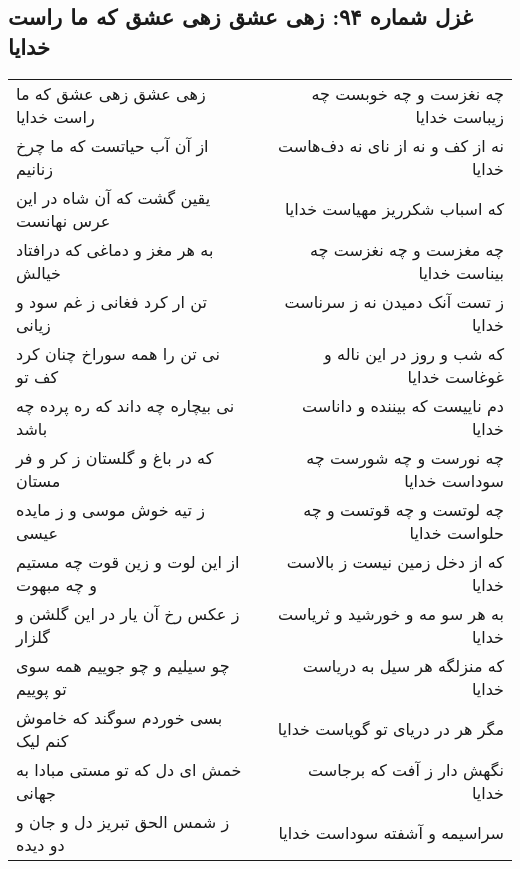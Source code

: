 \begin{center}
\section*{غزل شماره ۹۴: زهی عشق زهی عشق که ما راست خدایا}
\label{sec:0094}
\begin{longtable}{l p{0.5cm} r}
زهی عشق زهی عشق که ما راست خدایا
&&
چه نغزست و چه خوبست چه زیباست خدایا
\\
از آن آب حیاتست که ما چرخ زنانیم
&&
نه از کف و نه از نای نه دف‌هاست خدایا
\\
یقین گشت که آن شاه در این عرس نهانست
&&
که اسباب شکرریز مهیاست خدایا
\\
به هر مغز و دماغی که درافتاد خیالش
&&
چه مغزست و چه نغزست چه بیناست خدایا
\\
تن ار کرد فغانی ز غم سود و زیانی
&&
ز تست آنک دمیدن نه ز سرناست خدایا
\\
نی تن را همه سوراخ چنان کرد کف تو
&&
که شب و روز در این ناله و غوغاست خدایا
\\
نی بیچاره چه داند که ره پرده چه باشد
&&
دم ناییست که بیننده و داناست خدایا
\\
که در باغ و گلستان ز کر و فر مستان
&&
چه نورست و چه شورست چه سوداست خدایا
\\
ز تیه خوش موسی و ز مایده عیسی
&&
چه لوتست و چه قوتست و چه حلواست خدایا
\\
از این لوت و زین قوت چه مستیم و چه مبهوت
&&
که از دخل زمین نیست ز بالاست خدایا
\\
ز عکس رخ آن یار در این گلشن و گلزار
&&
به هر سو مه و خورشید و ثریاست خدایا
\\
چو سیلیم و چو جوییم همه سوی تو پوییم
&&
که منزلگه هر سیل به دریاست خدایا
\\
بسی خوردم سوگند که خاموش کنم لیک
&&
مگر هر در دریای تو گویاست خدایا
\\
خمش ای دل که تو مستی مبادا به جهانی
&&
نگهش دار ز آفت که برجاست خدایا
\\
ز شمس الحق تبریز دل و جان و دو دیده
&&
سراسیمه و آشفته سوداست خدایا
\\
\end{longtable}
\end{center}
